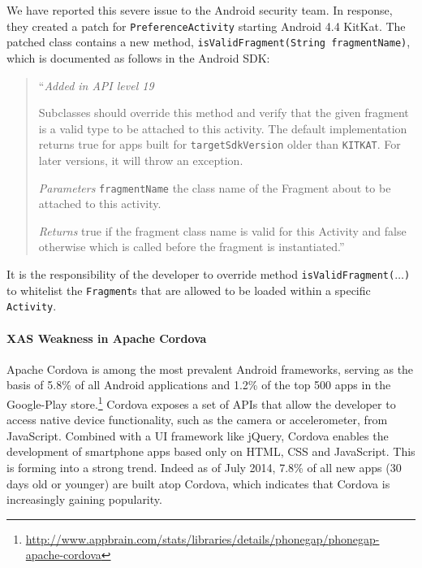 We have reported this severe issue to the Android security team. In response, they
created a patch for \texttt{PreferenceActivity} starting Android 4.4 KitKat. 
The patched class contains a new method, \texttt{isValidFragment(String fragmentName)}, 
which is documented as follows in the Android SDK:
\begin{quote}
	``\textit{Added in API level 19}
	
	Subclasses should override this method and verify that the given fragment
	is a valid type to be attached to this activity. The default implementation
	returns true for apps built for \texttt{targetSdkVersion}
	older than \texttt{KITKAT}. For later versions, it will throw an exception.
	
	\textit{Parameters} \texttt{fragmentName} the class name of the Fragment
	about to be attached to this activity. 
	
	\textit{Returns} true if the fragment class name is valid for this
	Activity and false otherwise which is called before the fragment is
	instantiated.'' 
\end{quote}
It is the responsibility of the developer to override method {\tt isValidFragment($\ldots$)} to whitelist the {\tt Fragment}s that are allowed to be loaded within a specific
{\tt Activity}.

\paragraph{XAS Weakness in Apache Cordova}\label{Se:CordovaXAS}

Apache Cordova is among the most prevalent Android frameworks, serving as the basis of 5.8\% of all Android applications and 1.2\% of the top 500 apps in the Google-Play store.\footnote{\url{http://www.appbrain.com/stats/libraries/details/phonegap/phonegap-apache-cordova}} Cordova exposes a set of APIs that allow the developer to access native device functionality, such as the camera or accelerometer, from JavaScript. Combined with a UI framework like jQuery, Cordova enables the development of smartphone apps based only
on HTML, CSS and JavaScript. This is forming into a strong trend. Indeed as of July 2014, 7.8\% of all new apps (30 days old or younger) are built atop Cordova, which indicates that Cordova is increasingly gaining popularity.

